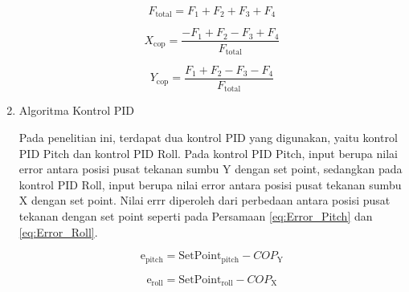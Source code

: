 \begin{enumerate}[label=\Alph*.]
    \begin{equation}
      F_{\mathrm{total}} = F_1 + F_2 + F_3 + F_4
      \label{eq:Total_Force}
    \end{equation}

    \begin{equation}
      X_{\mathrm{cop}} = \frac{- F_1 + F_2 - F_3 + F_4}{F_{\mathrm{total}}}
      \label{eq:COP_X}
    \end{equation}

    \begin{equation}
      Y_{\mathrm{cop}} = \frac{F_1 + F_2 - F_3 - F_4}{F_{\mathrm{total}}}
      \label{eq:COP_Y}
    \end{equation}

    \item Algoritma Kontrol PID
    \label{subsec:algoritmakontrolpid}

    \hspace*{1em} Pada penelitian ini, terdapat dua kontrol PID yang digunakan, yaitu kontrol PID Pitch dan kontrol PID Roll. Pada kontrol PID Pitch, input berupa nilai error antara posisi pusat tekanan sumbu Y dengan set point, sedangkan pada kontrol PID Roll, input berupa nilai error antara posisi pusat tekanan sumbu X dengan set point. Nilai errr diperoleh dari perbedaan antara posisi pusat tekanan dengan set point seperti pada Persamaan \ref{eq:Error_Pitch} dan \ref{eq:Error_Roll}.

    \begin{equation}
      \mathrm{e}_{\mathrm{pitch}} = \mathrm{SetPoint}_{\mathrm{pitch}} - COP_{\mathrm{Y}}
      \label{eq:Error_Pitch}
    \end{equation}

    \begin{equation}
      \mathrm{e}_{\mathrm{roll}} = \mathrm{SetPoint}_{\mathrm{roll}} - COP_{\mathrm{X}}
      \label{eq:Error_Roll}
    \end{equation}
 
\end{enumerate}